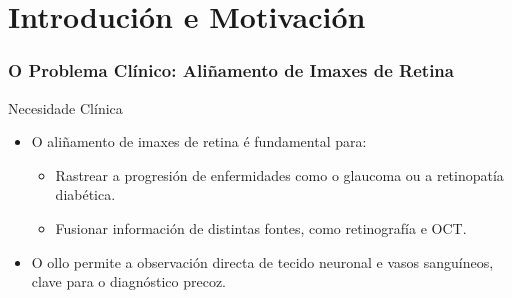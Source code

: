 \documentclass[xcolor=dvipsnames]{beamer}
\begin{document}
\section{Introdución e Motivación}
\begin{frame}
    \frametitle{O Problema Clínico: Aliñamento de Imaxes de Retina}

    \begin{block}{Necesidade Clínica}
        \begin{itemize}
            \item O aliñamento de imaxes de retina é fundamental para:
            \begin{itemize}
                \item Rastrear a progresión de enfermidades como o glaucoma ou a retinopatía diabética.
                \item Fusionar información de distintas fontes, como retinografía e OCT.
            \end{itemize}
            \item O ollo permite a observación directa de tecido neuronal e vasos sanguíneos, clave para o diagnóstico precoz.
        \end{itemize}
    \end{block}



\end{frame}
\end{document}
